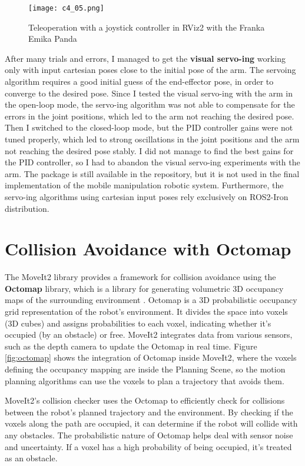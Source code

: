 \begin{figure}[t]
    \centering
    \texttt{[image: c4\_05.png]}
    \caption{Teleoperation with a joystick controller in RViz2 with the Franka Emika Panda}
    \label{fig:teleop}
\end{figure}


After many trials and errors, I managed to get the \textbf{visual servo-ing} working
only with input cartesian poses close to the initial pose of the arm. The servoing algorithm requires
a good initial guess of the end-effector pose, in order to converge to the desired pose.
Since I tested the visual servo-ing with the arm in the open-loop mode, the servo-ing algorithm was not able to
compensate for the errors in the joint positions, which led to the arm not reaching the desired pose.
Then I switched to the closed-loop mode, but the PID controller gains were not tuned properly, which led to strong
oscillations in the joint positions and the arm not reaching the desired pose stably. I did not manage to find the
best gains for the PID controller, so I had to abandon the visual servo-ing experiments with the arm.
The package is still available in the repository, but it is not used in the final implementation
of the mobile manipulation robotic system. Furthermore, the servo-ing algorithms using cartesian input poses
rely exclusively on ROS2-Iron distribution.

\section{Collision Avoidance with Octomap}

The MoveIt2 library provides a framework for collision avoidance using the \textbf{Octomap} library, which is a library for
generating volumetric 3D occupancy maps of the surrounding environment \cite{hornung13octomap}.
Octomap is a 3D probabilistic occupancy grid representation of the robot's environment. It divides the space into voxels
(3D cubes) and assigns probabilities to each voxel, indicating whether it's occupied (by an obstacle) or free.
MoveIt2 integrates data from various sensors, such as the depth camera to update the Octomap in real time.
Figure \ref{fig:octomap} shows the integration of Octomap inside MoveIt2, where the voxels defining the occupancy
mapping are inside the Planning Scene, so the motion planning algorithms can use the voxels to plan a trajectory
that avoids them.

MoveIt2's collision checker uses the Octomap to efficiently check for collisions between the robot's planned trajectory
and the environment. By checking if the voxels along the path are occupied, it can determine if the robot will collide 
with any obstacles. The probabilistic nature of Octomap helps deal with sensor noise and uncertainty. 
If a voxel has a high probability of being occupied, it's treated as an obstacle.

